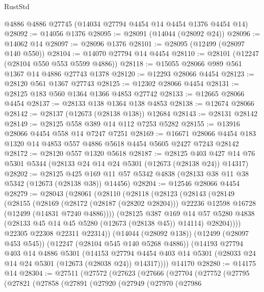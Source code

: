 \begin{lexlean}{RustStd}
\begin{coremodule}
    @4886
    @4886
    @27745
    (@14034 @27794 @4454 @14 @4454 @1376 @4454 @14)
@28092 := @14056 @1376
@28095 := @28091 (@14044 (@28092 @24))
@28096 := @14062 @14
@28097 := @28096 @1376
@28101 := @28095 (@12499 (@28097 @140 @550))
@28104 := @14070 @27794 @14 @4454
@28110 := @28101 (@12247 (@28104 @550 @553 @5599 @4886))
@28118 := @15055 @28066 @989 @561 @1367 @14 @4886 @27743 @1378
@28120 := @12293 @28066 @4454
@28123 := @28120 @561 @1367 @27743
@28125 := @12302 @28066 @4454
@28131 := @28125 @183 @560 @1364 @1366 @4853 @27742
@28133 := @12665 @28066 @4454
@28137 := @28133 @138 @1364 @138 @4853
@28138 := @12674 @28066
@28142 := @28137 (@12673 (@28138 @138)) @12684
@28143 := @28131 @28142
@28149 := @28125 @558 @389 @14 @112 @7253 @5282
@28155 := @13916 @28066 @4454 @558 @14 @7247 @7251
@28169 := @16671 @28066 @4454 @183 @1320 @14 @4853 @557 @4886 @5618 @4454 @5605 @2427 @7243 @28142
@28172 := @28120 @557 @1320 @5618
@28187 := @28125
    @403
    @427
    @14
    @76
    @5301
    @5344
    (@28133 @24 @14 @24 @5301 (@12673 (@28138 @24)) @14317)
@28202 := @28125
    @425
    @169
    @11
    @57
    @5342
    @4838
    (@28133 @38 @11 @38 @5342 (@12673 (@28138 @38)) @14456)
@28204 := @12546 @28066 @4454
@28279 := @28043
    (@28061
      (@28110
        (@28118
          (@28123
            (@28143
              (@28149
                (@28155
                  (@28169
                    (@28172 (@28187 (@28202 @28204)))
                    @22236
                    @12598
                    @16728
                    (@12499 (@14831 @7240 @4886))))
                (@28125
                  @387
                  @169
                  @14
                  @57
                  @5280
                  @4838
                  (@28133 @45 @14 @45 @5280 (@12673 (@28138 @45)) @14114)
                  @28204))))
          @22305
          @22308
          @22311
          @22314))
      (@14044 (@28092 @138))
      (@12499 (@28097 @453 @545))
      (@12247 (@28104 @545 @140 @5268 @4886))
      (@14193
        @27794
        @403
        @14
        @4886
        @5301
        (@14153
          @27794
          @4454
          @403
          @14
          @5301
          (@28033 @24 @14 @24 @5301 (@12673 (@28038 @24)) @14317))))
    @14170
@28280 := @14175 @14
@28304 := @27511
    (@27572
      (@27623
        (@27666
          (@27704
            (@27752
              (@27795
                (@27821
                  (@27858
                    (@27891
                      (@27920
                        (@27949
                          (@27970
                            (@27986

\end{coremodule}
\end{lexlean}
